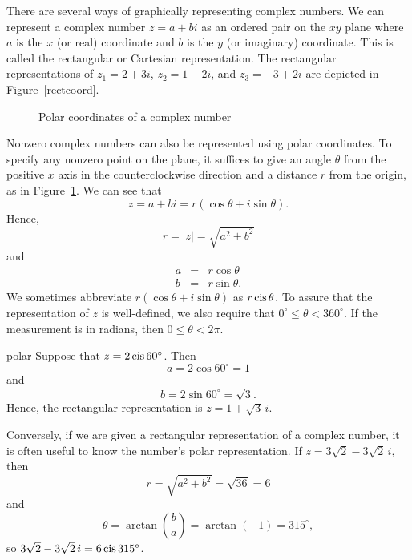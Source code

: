  
There are several ways of graphically representing complex numbers. We
can represent a complex number $z = a +bi$ as an ordered pair on the
$xy$ plane where $a$ is the $x$ (or real) coordinate and $b$ is the $y$
(or imaginary) coordinate. This is called the {\bfi rectangular} or
{\bfi Cartesian} representation. The rectangular representations of
$z_1 = 2 + 3i$, $z_2 = 1 - 2i$, and $z_3 = - 3 + 2i$ are depicted in
Figure~\ref{rectcoord}.
 
 
\begin{figure}[htb]
\begin{center}

\end{center}
\caption{Polar coordinates of a complex number}
\label{polarcoord}
\end{figure}
 
 
Nonzero complex numbers can also be represented using {\bfi polar
coordinates}.  To specify  any nonzero point on the plane, it suffices
to give an angle $\theta$ from the positive $x$ axis in the
counterclockwise direction and a distance $r$ from the origin, as in 
Figure~\ref{polarcoord}. We can see that 
\[
z = a + bi = r( \cos \theta + i \sin \theta).
\]
Hence,
\[
r = |z| = \sqrt{a^2+b^2}
\]
and
\begin{eqnarray*}
a & = & r \cos \theta \\
b & = & r \sin \theta.
\end{eqnarray*}
We sometimes abbreviate $r( \cos \theta + i \sin \theta)$ as $r \operatorname{cis}
\theta$\label{cosisin}.  To assure that the representation of $z$ is 
well-defined, we also require that $0^{\circ} \leq \theta <
360^{\circ}$.  If the measurement is in radians, then $0 \leq \theta <
2 \pi$. 
 
\begin{example}{polar}
Suppose that $z = 2 \operatorname{cis}  60^{\circ}$. Then
\[
a  =  2 \cos 60^{\circ}  =   1
\]
and
\[
b  =  2 \sin 60^{\circ}  =  \sqrt{3}.
\]
Hence, the rectangular representation is $z = 1+\sqrt{3}\, i$.
 
 
Conversely, if we are given a rectangular representation of a complex
number, it is often useful to know the number's polar representation.
If $z = 3 \sqrt{2} - 3 \sqrt{2}\, i$, then 
\[
r = \sqrt{a^2 + b^2} = \sqrt{36 } = 6
\]
and
\[
\theta = \arctan \left( \frac{b}{a} \right) = \arctan( - 1) =
315^{\circ},
\]
so $3 \sqrt{2} - 3 \sqrt{2}\, i=6 \operatorname{cis}  315^{\circ}$.
\end{example}
 
